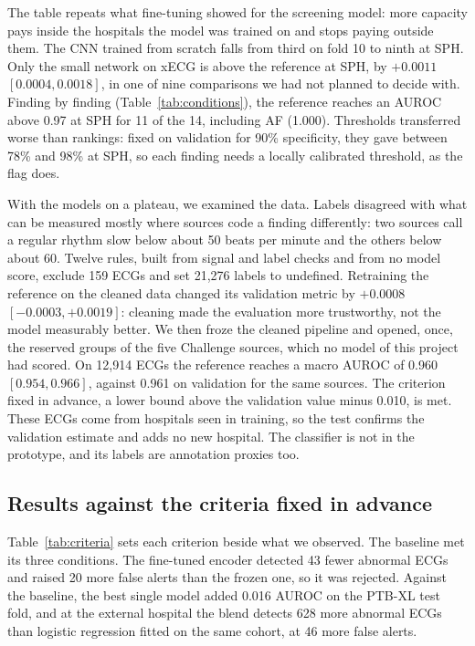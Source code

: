 \documentclass[letterpaper,11pt]{article}
\begin{document}
The table repeats what fine-tuning showed for the screening model: more capacity pays inside the hospitals the model was trained on and stops paying outside them. The CNN trained from scratch falls from third on fold 10 to ninth at SPH. Only the small network on xECG is above the reference at SPH, by $+0.0011$ $[0.0004, 0.0018]$, in one of nine comparisons we had not planned to decide with. Finding by finding (Table~\ref{tab:conditions}), the reference reaches an AUROC above 0.97 at SPH for 11 of the 14, including AF (1.000). Thresholds transferred worse than rankings: fixed on validation for 90\% specificity, they gave between 78\% and 98\% at SPH, so each finding needs a locally calibrated threshold, as the flag does.

With the models on a plateau, we examined the data. Labels disagreed with what can be measured mostly where sources code a finding differently: two sources call a regular rhythm slow below about 50 beats per minute and the others below about 60. Twelve rules, built from signal and label checks and from no model score, exclude 159 ECGs and set 21,276 labels to undefined. Retraining the reference on the cleaned data changed its validation metric by $+0.0008$ $[-0.0003, +0.0019]$: cleaning made the evaluation more trustworthy, not the model measurably better. We then froze the cleaned pipeline and opened, once, the reserved groups of the five Challenge sources, which no model of this project had scored. On 12,914 ECGs the reference reaches a macro AUROC of 0.960 $[0.954, 0.966]$, against 0.961 on validation for the same sources. The criterion fixed in advance, a lower bound above the validation value minus 0.010, is met. These ECGs come from hospitals seen in training, so the test confirms the validation estimate and adds no new hospital. The classifier is not in the prototype, and its labels are annotation proxies too.

\subsection{Results against the criteria fixed in advance}

Table~\ref{tab:criteria} sets each criterion beside what we observed. The baseline met its three conditions. The fine-tuned encoder detected 43 fewer abnormal ECGs and raised 20 more false alerts than the frozen one, so it was rejected. Against the baseline, the best single model added 0.016 AUROC on the PTB-XL test fold, and at the external hospital the blend detects 628 more abnormal ECGs than logistic regression fitted on the same cohort, at 46 more false alerts.
\end{document}
